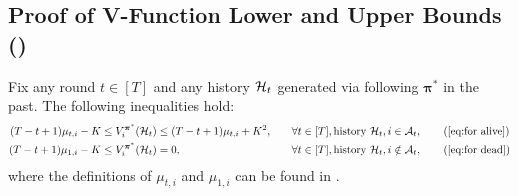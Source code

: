 \subsection{Proof of V-Function Lower and Upper Bounds ()}
\begin{lemma}\label{lem:u lower and upper bound formal}
Fix any round $t\in [T]$ and any history $\mathcal{H}_t$ generated via following $\bm \pi^\ast$ in the past. The following inequalities hold:
\begin{align}
(T-t+1) \mu_{t,i}-K &\leq V_i^{{\bm \pi}^\ast}(\mH_t)\leq (T-t+1) \mu_{t,i}+K^2,&&\quad \forall t\in [T],\text{history }\mH_t,i\in \mA_t,\tag{\ref{eq:for alive}}\\
(T-t+1) \mu_{1,i}-K &\leq V_i^{{\bm \pi}^\ast}(\mH_t)=0,&&\quad \forall t\in [T],\text{history }\mH_t,i\notin \mA_t, \tag{\ref{eq:for dead}}
\end{align}
where the definitions of $\mu_{t,i}$ and $\mu_{1,i}$ can be found in .
\end{lemma}
